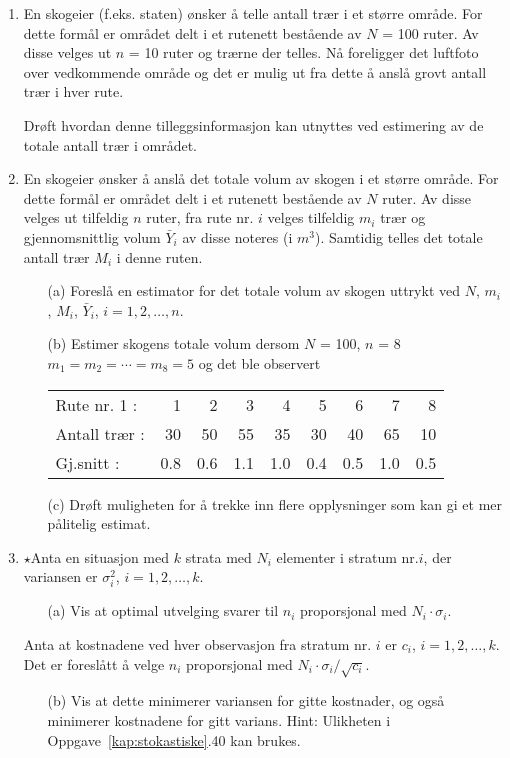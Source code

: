 \begin{enumerate}
\item  En skogeier (f.eks. staten) ønsker å telle antall trær i
et større område.  For dette formål er området delt i et
rutenett bestående av $N$ = 100 ruter.  Av disse velges ut $n$ = 10 ruter
og trærne der telles.  Nå foreligger det luftfoto over vedkommende
område og det er mulig ut fra dette å anslå grovt antall trær
i hver rute.

Drøft hvordan denne tilleggsinformasjon kan utnyttes ved estimering av de
totale antall trær i området.

\item  En skogeier ønsker å anslå det totale volum av skogen i et
større område.  For dette formål er området delt i et rutenett
bestående av $N$ ruter.  Av disse velges ut tilfeldig $n$ ruter, fra 
rute nr. $i$ velges tilfeldig $m_i$ trær og gjennomsnittlig volum
$\bar{Y}_i$ av disse noteres (i $m^3$).  Samtidig telles det totale antall
trær $M_i$ i denne ruten.

\begin{itemize}
\item[(a)]  Foreslå en estimator for det totale volum av skogen uttrykt
ved $N$, $m_i$, $M_i$, $\bar{Y}_i$,  $i = 1, 2, \ldots, n.$
\item[(b)]  Estimer skogens totale volum dersom $N$ = 100, $n$ = 8 $m_1 =
m_2 = \cdots = m_8 = 5$ og det ble observert

\begin{center}
\begin{tabular}{lrrrrrrrr}
Rute nr. 1 :       &   1 &   2 &   3 &   4 &   5 &   6 &   7 &   8 \\
Antall trær :  &  30 &  50 &  55 &  35 &  30 &  40 &  65 &  10 \\
Gj.snitt :         & 0.8 & 0.6 & 1.1 & 1.0 & 0.4 & 0.5 & 1.0 & 0.5
\end{tabular}
\end{center}
\item[(c)]  Drøft muligheten for å trekke inn flere opplysninger som
kan gi et mer pålitelig estimat.
\end{itemize}

\item $\star$Anta en situasjon med $k$ strata med $N_i$ elementer i stratum 
nr.$i$, der variansen er ${\sigma}_i^2$,  $i = 1, 2, \ldots, k$.

\begin{itemize}
\item[(a)]  Vis at optimal utvelging svarer til $n_i$ proporsjonal
med $N_i\cdot {\sigma}_i$.
\end{itemize}
Anta at kostnadene ved hver observasjon fra stratum nr. $i$ er $c_i$, $i=1,
2, \ldots, k$.  Det er foreslått å velge $n_i$ proporsjonal med
$N_i\cdot {\sigma}_i/\sqrt{c_i}$.
\begin{itemize}
\item[(b)]  Vis at dette minimerer variansen for gitte kostnader, og også
mini\-merer kostnadene for gitt varians.
Hint:  Ulikheten i Oppgave~\ref*{kap:stokastiske}.40 kan brukes.
\end{itemize}


\end{enumerate}
